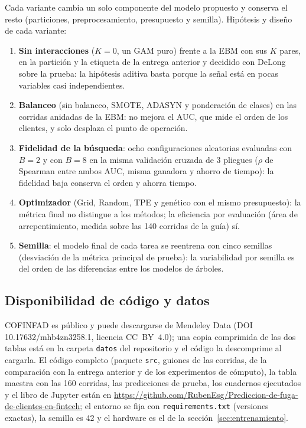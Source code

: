 Cada variante cambia un solo componente del modelo propuesto y conserva el resto (particiones,
preprocesamiento, presupuesto y semilla). Hipótesis y diseño de cada variante:
\begin{enumerate}
  \item \textbf{Sin interacciones} ($K = 0$, un GAM puro) frente a la EBM con sus $K$ pares, en la
        partición y la etiqueta de la entrega anterior y decidido con DeLong sobre la prueba: la hipótesis
        aditiva basta porque la señal está en pocas variables casi independientes.
  \item \textbf{Balanceo} (sin balanceo, SMOTE, ADASYN y ponderación de clases) en las corridas anidadas de
        la EBM: no mejora el AUC, que mide el orden de los clientes, y solo desplaza el punto de operación.
  \item \textbf{Fidelidad de la búsqueda}: ocho configuraciones aleatorias evaluadas con $B = 2$ y con
        $B = 8$ en la misma validación cruzada de 3 pliegues ($\rho$ de Spearman entre ambos AUC, misma
        ganadora y ahorro de tiempo): la fidelidad baja conserva el orden y ahorra tiempo.
  \item \textbf{Optimizador} (Grid, Random, TPE y genético con el mismo presupuesto): la métrica final no
        distingue a los métodos; la eficiencia por evaluación (área de arrepentimiento, medida sobre las 140
        corridas de la guía) sí.
  \item \textbf{Semilla}: el modelo final de cada tarea se reentrena con cinco semillas (desviación de la
        métrica principal de prueba): la variabilidad por semilla es del orden de las diferencias entre los
        modelos de árboles.
\end{enumerate}

\subsection{Disponibilidad de código y datos}
\label{sec:disponibilidad}

COFINFAD es público y puede descargarse de Mendeley Data (DOI 10.17632/mhb4zn3258.1, licencia CC~BY~4.0);
una copia comprimida de las dos tablas está en la carpeta \texttt{datos} del repositorio y el código la
descomprime al cargarla. El código completo (paquete \texttt{src}, guiones de las corridas, de la comparación
con la entrega anterior y de los experimentos de cómputo), la tabla maestra con las 160 corridas, las
predicciones de prueba, los cuadernos ejecutados y el libro de Jupyter están en
\url{https://github.com/RubenEsg/Prediccion-de-fuga-de-clientes-en-fintech}; el entorno se fija con
\texttt{requirements.txt} (versiones exactas), la semilla es 42 y el hardware es el de la
sección~\ref{sec:entrenamiento}.
